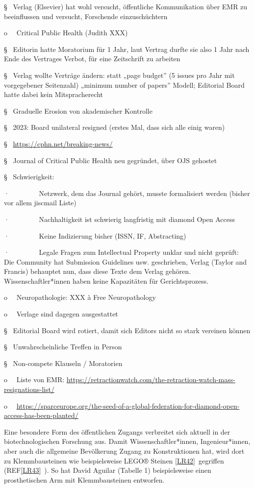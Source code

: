 \documentclass[
  letterpaper,
  DIV=11,
  numbers=noendperiod]{scrreprt}
\begin{document}
§~ Verlag (Elsevier) hat wohl versucht, öffentliche Kommunikation über
EMR zu beeinflussen und versucht, Forschende einzuschüchtern

o~~ Critical Public Health (Judith XXX)

§~ Editorin hatte Moratorium für 1 Jahr, laut Vertrag durfte sie also 1
Jahr nach Ende des Vertrages Verbot, für eine Zeitschrift zu arbeiten

§~ Verlag wollte Verträge ändern: statt „page budget'' (5 issues pro
Jahr mit vorgegebener Seitenzahl) „minimum number of papers'' Modell;
Editorial Board hatte dabei kein Mitspracherecht

§~ Graduelle Erosion von akademischer Kontrolle

§~ 2023: Board unilateral resigned (erstes Mal, dass sich alle einig
waren)

§~ \url{https://cphn.net/breaking-news/}

§~ Journal of Critical Public Health neu gegründet, über OJS gehostet

§~ Schwierigkeit:

·~~~~~~~~ Netzwerk, dem das Journal gehört, musste formalisiert werden
(bisher vor allem jiscmail Liste)

·~~~~~~~~ Nachhaltigkeit ist schwierig langfristig mit diamond Open
Access

·~~~~~~~~ Keine Indizierung bisher (ISSN, IF, Abstracting)

·~~~~~~~~ Legale Fragen zum Intellectual Property unklar und nicht
geprüft: Die Community hat Submission Guidelines usw. geschrieben,
Verlag (Taylor and Francis) behauptet nun, dass diese Texte dem Verlag
gehören. Wissenschaftler*innen haben keine Kapazitäten für
Gerichtsprozess.

o~~ Neuropathologie: XXX à Free Neuropathology

o~~ Verlage sind dagegen ausgestattet

§~ Editorial Board wird rotiert, damit sich Editors nicht so stark
vereinen können

§~ Unwahrscheinliche Treffen in Person

§~ Non-compete Klauseln / Moratorien

o~~ Liste von EMR:
\url{https://retractionwatch.com/the-retraction-watch-mass-resignations-list/}

o~~
\url{https://sparceurope.org/the-seed-of-a-global-federation-for-diamond-open-access-has-been-planted/}

Eine besondere Form des öffentlichen Zugangs verbreitet sich aktuell in
der biotechnologischen Forschung aus. Damit Wissenschaftler*innen,
Ingenieur*innen, aber auch die allgemeine Bevölkerung Zugang zu
Konstruktionen hat, wird dort zu Klemmbausteinen wie beispielsweise
LEGO® Steinen \hyperref[_msocom_42]{{[}LR42{]}}~gegriffen
(REF\hyperref[_msocom_43]{{[}LR43{]}}~). So hat David Aguilar (Tabelle
1) beispielsweise einen prosthetischen Arm mit Klemmbausteinen
entworfen.
\end{document}
